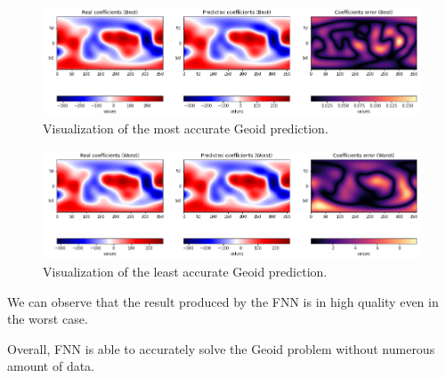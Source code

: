\begin{figure}[H]
    \caption{Visualization of the most accurate Geoid prediction.}
    \includegraphics[scale=0.4]{figures/geoid_images/Geoid_Best_visualization.png}
\end{figure}

\begin{figure}[H]
    \caption{Visualization of the least accurate Geoid prediction.}
    \includegraphics[scale=0.4]{figures/geoid_images/Geoid_Worst_visualization.png}
\end{figure}

We can observe that the result produced by the FNN is in high quality even in the worst case.

Overall, FNN is able to accurately solve the Geoid problem without numerous amount of data.


